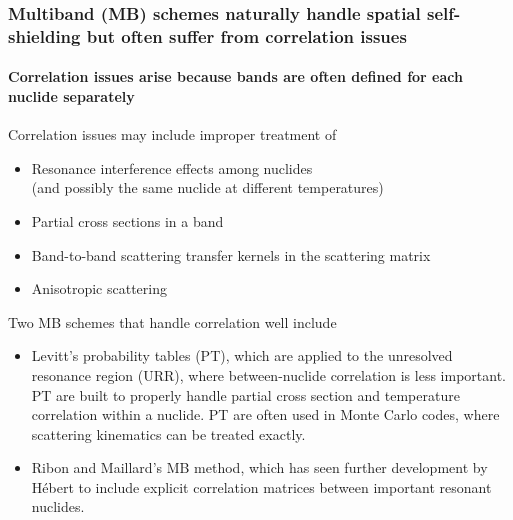 \documentclass[compress,10pt]{beamer}
\newcommand{\backupend}{
    \setcounter{framenumber}{\value{finalframe}}
}
\begin{document}
\begin{frame}
   \frametitle{Multiband (MB) schemes naturally handle spatial self-shielding but often suffer from correlation issues}
   \framesubtitle{Correlation issues arise because bands are often defined for each nuclide separately}

   \begin{block}{Correlation issues may include improper treatment of}
   \begin{itemize}
       \item Resonance interference effects among nuclides \\(and possibly the same nuclide at different temperatures)
       \item Partial cross sections in a band
       \item Band-to-band scattering transfer kernels in the scattering matrix
       \item Anisotropic scattering
   \end{itemize}
   \end{block}

   \begin{block}{Two MB schemes that handle correlation well include}
   \begin{itemize}
       \item Levitt's probability tables (PT), which are applied to the unresolved resonance region (URR), where between-nuclide correlation is less important. PT are built to properly handle partial cross section and temperature correlation within a nuclide. PT are often used in Monte Carlo codes, where scattering kinematics can be treated exactly.
       \item Ribon and Maillard's MB method, which has seen further development by H\'ebert to include explicit correlation matrices between important resonant nuclides.
   \end{itemize}
   \end{block}

\end{frame}

\backupend
\end{document}
